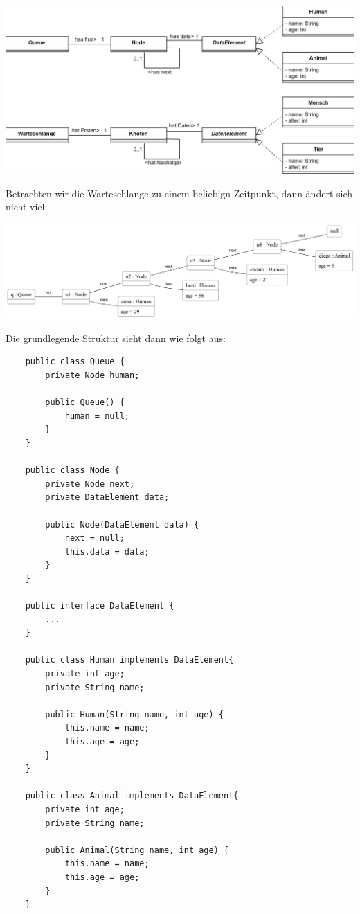 \documentclass{article}
\begin{document}
\begin{center}
    \includegraphics[scale = 0.2]{../media/linked_list_nodes_diagram_interface.png}
\end{center}
Betrachten wir die Warteschlange zu einem beliebign Zeitpunkt, dann ändert sich nicht viel: 

\begin{center}
    \includegraphics[scale = 0.125]{../media/linked_list_nodes_objectdiagram_v2.png}
\end{center}
Die grundlegende Struktur sieht dann wie folgt aus: 
\begin{verbatim}
    public class Queue {
        private Node human;

        public Queue() {
            human = null;
        }
    }

    public class Node {
        private Node next;
        private DataElement data;

        public Node(DataElement data) {
            next = null;
            this.data = data;
        }
    }

    public interface DataElement {
        ...
    }

    public class Human implements DataElement{
        private int age;
        private String name;

        public Human(String name, int age) {
            this.name = name;
            this.age = age;
        }
    }

    public class Animal implements DataElement{
        private int age;
        private String name;

        public Animal(String name, int age) {
            this.name = name;
            this.age = age;
        }     
    }
\end{verbatim}
\end{document}
